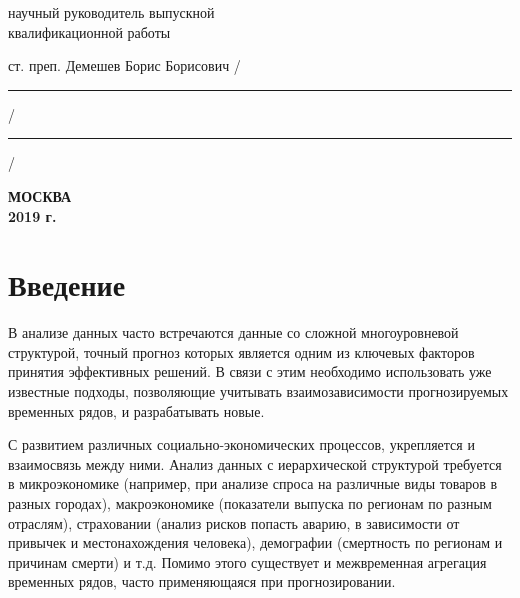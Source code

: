 \documentclass[12pt,a4paper, oneside]{extreport}
\begin{document}
\hfill{}

\noindent
научный руководитель выпускной \\
квалификационной работы

\noindent
ст. преп. Демешев Борис Борисович
\hfill /\rule{6em}{0.5pt}/\rule{6em}{0.5pt}/

\hfill{}

%
%

\vfill

\begin{center}
\normalsize \bfseries МОСКВА \\ 2019 г.
\end{center}
\endgroup




\tableofcontents  %



\chapter*{Введение}


В анализе данных часто встречаются данные со сложной многоуровневой структурой, точный прогноз которых является одним из ключевых факторов принятия эффективных решений. В связи с этим необходимо использовать уже известные подходы, позволяющие учитывать взаимозависимости прогнозируемых временных рядов, и разрабатывать новые.  


С развитием различных социально-экономических процессов, укрепляется и взаимосвязь между ними. Анализ данных с иерархической структурой требуется в микроэкономике (например, при анализе спроса на различные виды товаров в разных городах), макроэкономике (показатели выпуска по регионам по разным отраслям), страховании (анализ рисков попасть аварию, в зависимости от привычек и местонахождения человека),  демографии (смертность по регионам и причинам смерти) и т.д.  Помимо этого существует и межвременная агрегация временных рядов, часто применяющаяся при прогнозировании.  
\end{document}
